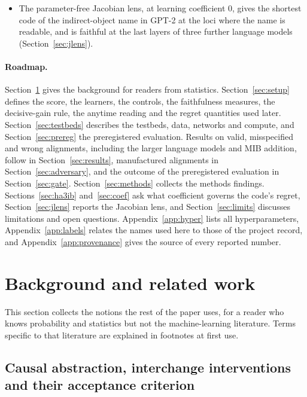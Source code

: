 \documentclass[11pt,a4paper]{article}
\begin{document}
\begin{itemize}
\item The parameter-free Jacobian lens, at learning coefficient 0, gives the shortest code of the indirect-object name in GPT-2 at the loci where the name is readable, and is faithful at the last layers of three further language models (Section~\ref{sec:jlens}).
\end{itemize}

\paragraph{Roadmap.} Section~\ref{sec:background} gives the background for readers from statistics. Section~\ref{sec:setup} defines the score, the learners, the controls, the faithfulness measures, the decisive-gain rule, the anytime reading and the regret quantities used later. Section~\ref{sec:testbeds} describes the testbeds, data, networks and compute, and Section~\ref{sec:prereg} the preregistered evaluation. Results on valid, misspecified and wrong alignments, including the larger language models and MIB addition, follow in Section~\ref{sec:results}, manufactured alignments in Section~\ref{sec:adversary}, and the outcome of the preregistered evaluation in Section~\ref{sec:gate}. Section~\ref{sec:methods} collects the methods findings. Sections~\ref{sec:ha3ib} and~\ref{sec:coef} ask what coefficient governs the code's regret, Section~\ref{sec:jlens} reports the Jacobian lens, and Section~\ref{sec:limits} discusses limitations and open questions. Appendix~\ref{app:hyper} lists all hyperparameters, Appendix~\ref{app:labels} relates the names used here to those of the project record, and Appendix~\ref{app:provenance} gives the source of every reported number.

\section{Background and related work}
\label{sec:background}

This section collects the notions the rest of the paper uses, for a reader who knows probability and statistics but not the machine-learning literature. Terms specific to that literature are explained in footnotes at first use.

\subsection{Causal abstraction, interchange interventions and their acceptance criterion}
\label{sec:bg:ca}
\end{document}
